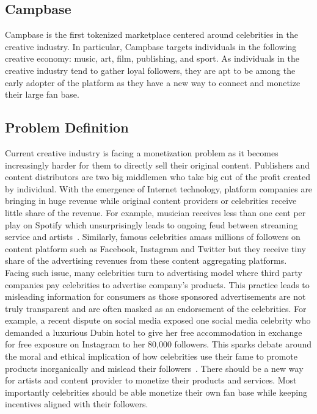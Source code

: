 \documentclass[letterpaper,11pt]{article}
\begin{document}
\subsection{Campbase}
Campbase is the first tokenized marketplace centered around celebrities in the creative industry. In particular, Campbase targets individuals in the following creative economy: music, art, film, publishing, and sport. As individuals in the creative industry tend to gather loyal followers, they are apt to be among the early adopter of the platform as they have a new way to connect and monetize their large fan base.

\subsection{Problem Definition}
Current creative industry is facing a monetization problem as it becomes increasingly harder for them to directly sell their original content. Publishers and content distributors are two big middlemen who take big cut of the profit created by individual. With the emergence of Internet technology, platform companies are bringing in huge revenue while original content providers or celebrities receive little share of the revenue. For example, musician receives less than one cent per play on Spotify which unsurprisingly leads to ongoing feud between streaming service and artists~\cite{taylorswiftspotify, jayzspotify}. Similarly, famous celebrities amass millions of followers on content platform such as Facebook, Instagram and Twitter but they receive tiny share of the advertising revenues from these content aggregating platforms. Facing such issue, many celebrities turn to advertising model where third party companies pay celebrities to advertise company's products. This practice leads to misleading information for consumers as those sponsored advertisements are not truly transparent and are often masked as an endorsement of the celebrities. For example, a recent dispute on social media exposed one social media celebrity who demanded a luxurious Dubin hotel to give her free accommodation in exchange for free exposure on Instagram to her 80,000 followers. This sparks debate around the moral and ethical implication of how celebrities use their fame to promote products inorganically and mislead their followers~\cite{dublinban, hotelban}. There should be a new way for artists and content provider to monetize their products and services. Most importantly celebrities should be able monetize their own fan base while keeping incentives aligned with their followers.
\end{document}

